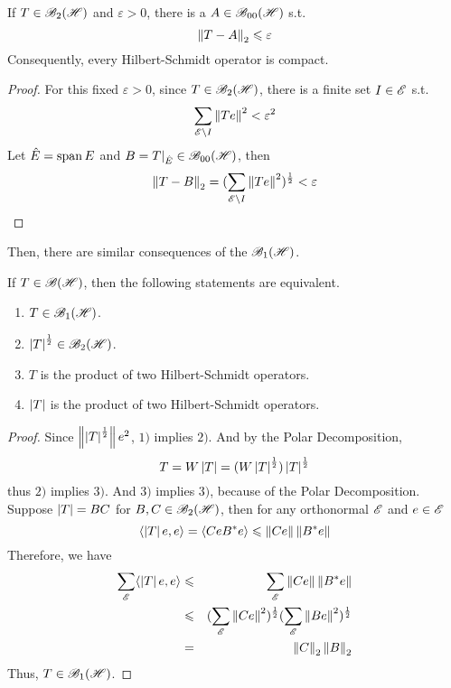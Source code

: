\documentclass[a4paper,11pt]{report}
\begin{document}
\begin{cor}
	If $T \in \mathscr{B}_{2}\mathscr{(H)}$ and $\varepsilon > 0$, there is a $A \in \mathscr{B}_{00}\mathscr{(H)}$ s.t.
	\begin{equation*}
		\left\lVert T-A\right\lVert_2 \leqslant \varepsilon
	\end{equation*}
	Consequently, every Hilbert-Schmidt operator is compact.
\end{cor}
\begin{proof}
	For this fixed $\varepsilon > 0$, since $T \in \mathscr{B}_{2}\mathscr{(H)}$, there is a finite set $I \in \mathscr{E}$ s.t.
	\begin{equation*}
		\sum_{\mathscr{E} \backslash I} \left\lVert Te\right\lVert^2 < \varepsilon^2
	\end{equation*}
	Let $\hat{E} = \operatorname{span}{E}$ and $B = T|_{\hat{E}} \in \mathscr{B}_{00}\mathscr{(H)}$, then
	\begin{equation*}
		\left\lVert T-B\right\lVert_2 = (\sum_{\mathscr{E} \backslash I} \left\lVert Te\right\lVert^2)^{\frac{1}{2}} < \varepsilon \qedhere
	\end{equation*}
\end{proof}

Then, there are similar consequences of the $\mathscr{B}_{1}\mathscr{(H)}$.

\begin{prop}
	If $T \in \mathscr{B(H)}$, then the following statements are equivalent.
	\begin{enumerate}[label=\arabic*)]
		\item $T \in \mathscr{B}_{1}\mathscr{(H)}$.
		\item $\left\lvert T\right\lvert^{\frac{1}{2}} \in \mathscr{B}_{2}\mathscr{(H)}$.
		\item $T$ is the product of two Hilbert-Schmidt operators.
		\item $\left\lvert T\right\lvert$ is the product of two Hilbert-Schmidt operators.
	\end{enumerate}
\end{prop}
\begin{proof}
	Since $\left\lVert\left\lvert T\right\lvert^{\frac{1}{2}}\right\lVert{e}^2$, $1)$ implies $2)$. And by the Polar Decomposition,
	\begin{equation*}
		T = W \left\lvert T\right\lvert = (W \left\lvert T\right\lvert^{\frac{1}{2}})\left\lvert T\right\lvert^{\frac{1}{2}}
	\end{equation*}
	thus $2)$ implies $3)$. And $3)$ implies $3)$, because of the Polar Decomposition. \\
	Suppose $\left\lvert T\right\lvert = BC$ for $B,C \in \mathscr{B}_{2}\mathscr{(H)}$, then for any orthonormal $\mathscr{E}$ and $e \in \mathscr{E}$
	\begin{equation*}
		\langle \left\lvert T\right\lvert e, e \rangle = \langle Ce B^{*}e \rangle \leqslant \left\lVert Ce\right\lVert\left\lVert B^{*}e\right\lVert
	\end{equation*}
	Therefore, we have 
	\begin{eqnarray*}
		\sum_{\mathscr{E}} \langle \left\lvert T\right\lvert e, e \rangle &\leqslant& \sum_{\mathscr{E}} \left\lVert Ce\right\lVert\left\lVert B^{*}e\right\lVert \\
		&\leqslant& (\sum_{\mathscr{E}} \left\lVert Ce\right\lVert^2)^{\frac{1}{2}} (\sum_{\mathscr{E}} \left\lVert Be\right\lVert^2)^{\frac{1}{2}} \\ 
		&=& \left\lVert C\right\lVert_2 \left\lVert B\right\lVert_2
	\end{eqnarray*}
	Thus, $T \in \mathscr{B}_{1}\mathscr{(H)}$.
\end{proof}
\end{document}
